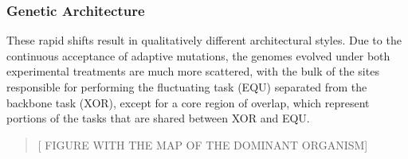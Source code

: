 \subsubsection{Genetic Architecture}

These rapid shifts result in qualitatively different architectural styles. Due to the continuous acceptance of adaptive mutations, the genomes evolved under both experimental treatments are much more scattered, with the bulk of the sites responsible for performing the fluctuating task (EQU) separated from the backbone task (XOR), except for a core region of overlap, which represent portions of the tasks that are shared between XOR and EQU.
\begin{quote}
[ FIGURE WITH THE MAP OF THE DOMINANT ORGANISM]
\end{quote}
